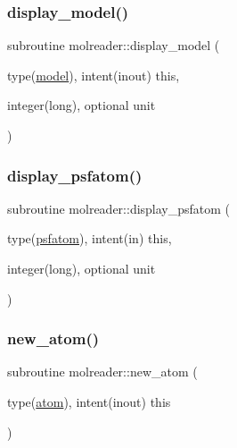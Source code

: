 \mbox{\label{namespacemolreader_a462d061944b74f7145b8bf89fc3439fc}} 
\subsubsection{\texorpdfstring{display\+\_\+model()}{display\_model()}}
{\footnotesize\ttfamily subroutine molreader\+::display\+\_\+model (\begin{DoxyParamCaption}\item[{type(\hyperlink{structmolreader_1_1model}{model}), intent(inout)}]{this,  }\item[{integer(long), optional}]{unit }\end{DoxyParamCaption})\hspace{0.3cm}{\ttfamily [private]}}

\mbox{\label{namespacemolreader_a737dbe023a6cbecab8269981ffdfa31c}} 
\subsubsection{\texorpdfstring{display\+\_\+psfatom()}{display\_psfatom()}}
{\footnotesize\ttfamily subroutine molreader\+::display\+\_\+psfatom (\begin{DoxyParamCaption}\item[{type(\hyperlink{structmolreader_1_1psfatom}{psfatom}), intent(in)}]{this,  }\item[{integer(long), optional}]{unit }\end{DoxyParamCaption})\hspace{0.3cm}{\ttfamily [private]}}

\mbox{\label{namespacemolreader_ae1000e1ea4e46f858a3640c08563c3ff}} 
\subsubsection{\texorpdfstring{new\+\_\+atom()}{new\_atom()}}
{\footnotesize\ttfamily subroutine molreader\+::new\+\_\+atom (\begin{DoxyParamCaption}\item[{type(\hyperlink{structmolreader_1_1atom}{atom}), intent(inout)}]{this }\end{DoxyParamCaption})\hspace{0.3cm}{\ttfamily [private]}}

